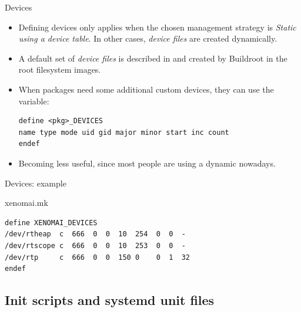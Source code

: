 \begin{frame}[fragile]{Devices}
  \begin{itemize}
  \item Defining devices only applies when the chosen 
    management strategy is {\em Static using a device table}. In other
    cases, {\em device files} are created dynamically.
  \item A default set of {\em device files} is described in
     and created by Buildroot in the
    root filesystem images.
  \item When packages need some additional custom devices, they can
    use the  variable:
{\small
  \begin{block}{}
\begin{verbatim}
define <pkg>_DEVICES
name type mode uid gid major minor start inc count
endef
\end{verbatim}
  \end{block}}
\item Becoming less useful, since most people are using a dynamic
   nowadays.
  \end{itemize}
\end{frame}

\begin{frame}[fragile]{Devices: example}

    \begin{block}{xenomai.mk}
      \begin{verbatim}
define XENOMAI_DEVICES
/dev/rtheap  c  666  0  0  10  254  0  0  -
/dev/rtscope c  666  0  0  10  253  0  0  -
/dev/rtp     c  666  0  0  150 0    0  1  32
endef
      \end{verbatim}
    \end{block}

\end{frame}

\subsection{Init scripts and systemd unit files}

